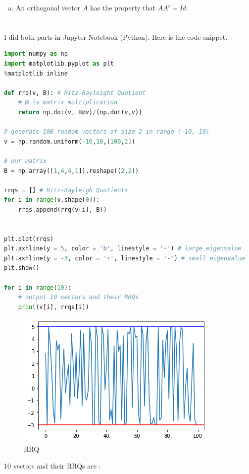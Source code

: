 \documentclass[12pt]{article}
\begin{document}
\begin{enumerate}[(a)]
	\item An orthogonal vector $ A $ has the property that $ AA^t = Id $.
\end{enumerate}
\newpage

\section{} %
I did both parts in Jupyter Notebook (Python). Here is the code snippet.
\begin{lstlisting}[language=Python]
import numpy as np
import matplotlib.pyplot as plt
%matplotlib inline

def rrq(v, B): # Ritz-Rayleight Quotient
	# @ is matrix multiplication
	return np.dot(v, B@v)/(np.dot(v,v))

# generate 100 random vectors of size 2 in range (-10, 10) 
v = np.random.uniform(-10,10,[100,2]) 

# our matrix
B = np.array([1,4,4,1]).reshape((2,2))
	
rrqs = [] # Ritz-Rayleigh Quotients
for i in range(v.shape[0]):
	rrqs.append(rrq(v[i], B))


plt.plot(rrqs)
plt.axhline(y = 5, color = 'b', linestyle = '-') # large eigenvalue
plt.axhline(y = -3, color = 'r', linestyle = '-') # small eigenvalue
plt.show()

for i in range(10):
	# output 10 vectors and their RRQs
	print(v[i], rrqs[i])
\end{lstlisting}
\begin{figure}[H]
	\centering
	\includegraphics[width=\textwidth/2]{images/4_graph.png}
	\caption{RRQ}
	\label{fig:4:RRQ}
\end{figure}
10 vectors and their RRQs are :
\end{document}
